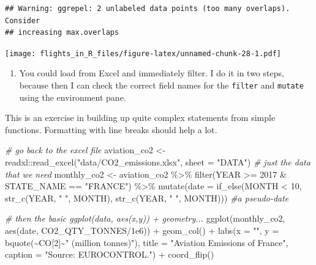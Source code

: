 \documentclass[
]{book}
\newenvironment{Shaded}{\begin{snugshade}}{\end{snugshade}}
\newcommand{\AttributeTok}[1]{\textcolor[rgb]{0.77,0.63,0.00}{#1}}
\newcommand{\CommentTok}[1]{\textcolor[rgb]{0.56,0.35,0.01}{\textit{#1}}}
\newcommand{\DecValTok}[1]{\textcolor[rgb]{0.00,0.00,0.81}{#1}}
\newcommand{\FloatTok}[1]{\textcolor[rgb]{0.00,0.00,0.81}{#1}}
\newcommand{\FunctionTok}[1]{\textcolor[rgb]{0.00,0.00,0.00}{#1}}
\newcommand{\NormalTok}[1]{#1}
\newcommand{\OtherTok}[1]{\textcolor[rgb]{0.56,0.35,0.01}{#1}}
\newcommand{\SpecialCharTok}[1]{\textcolor[rgb]{0.00,0.00,0.00}{#1}}
\newcommand{\StringTok}[1]{\textcolor[rgb]{0.31,0.60,0.02}{#1}}
\providecommand{\tightlist}{%
  \setlength{\itemsep}{0pt}\setlength{\parskip}{0pt}}
\begin{document}
\begin{verbatim}
## Warning: ggrepel: 2 unlabeled data points (too many overlaps). Consider
## increasing max.overlaps
\end{verbatim}

\texttt{[image: flights\_in\_R\_files/figure-latex/unnamed-chunk-28-1.pdf]}

\begin{enumerate}
\def\labelenumi{\arabic{enumi})}
\setcounter{enumi}{2}
\tightlist
\item
  You could load from Excel and immediately filter. I do it in two steps, because then I can check the correct field names for the \texttt{filter} and \texttt{mutate} using the environment pane.
\end{enumerate}

This is an exercise in building up quite complex statements from simple functions. Formatting with line breaks should help a lot.

\begin{Shaded}
\begin{Highlighting}[]
\CommentTok{\# go back to the excel file}
\NormalTok{aviation\_co2 }\OtherTok{\textless{}{-}}\NormalTok{ readxl}\SpecialCharTok{::}\FunctionTok{read\_excel}\NormalTok{(}\StringTok{"data/CO2\_emissions.xlsx"}\NormalTok{, }
                                  \AttributeTok{sheet =} \StringTok{"DATA"}\NormalTok{)}
\CommentTok{\# just the data that we need}
\NormalTok{monthly\_co2 }\OtherTok{\textless{}{-}}\NormalTok{ aviation\_co2 }\SpecialCharTok{\%\textgreater{}\%} 
  \FunctionTok{filter}\NormalTok{(YEAR }\SpecialCharTok{\textgreater{}=} \DecValTok{2017} \SpecialCharTok{\&}\NormalTok{ STATE\_NAME }\SpecialCharTok{==} \StringTok{"FRANCE"}\NormalTok{) }\SpecialCharTok{\%\textgreater{}\%} 
  \FunctionTok{mutate}\NormalTok{(}\AttributeTok{date =} \FunctionTok{if\_else}\NormalTok{(MONTH }\SpecialCharTok{\textless{}} \DecValTok{10}\NormalTok{,}
                        \FunctionTok{str\_c}\NormalTok{(YEAR, }\StringTok{"  "}\NormalTok{, MONTH), }
                        \FunctionTok{str\_c}\NormalTok{(YEAR, }\StringTok{" "}\NormalTok{, MONTH))) }\CommentTok{\#a pseudo{-}date}

\CommentTok{\# then the basic ggplot(data, aes(x,y)) + geometry...}
\FunctionTok{ggplot}\NormalTok{(monthly\_co2, }\FunctionTok{aes}\NormalTok{(date, CO2\_QTY\_TONNES}\SpecialCharTok{/}\FloatTok{1e6}\NormalTok{)) }\SpecialCharTok{+}
  \FunctionTok{geom\_col}\NormalTok{() }\SpecialCharTok{+}
  \FunctionTok{labs}\NormalTok{(}\AttributeTok{x =} \StringTok{""}\NormalTok{, }
       \AttributeTok{y =} \FunctionTok{bquote}\NormalTok{(}\SpecialCharTok{\textasciitilde{}}\NormalTok{CO[}\DecValTok{2}\NormalTok{]}\SpecialCharTok{\textasciitilde{}}\StringTok{" (million tonnes)"}\NormalTok{),}
       \AttributeTok{title =} \StringTok{"Aviation Emissions of France"}\NormalTok{,}
       \AttributeTok{caption =} \StringTok{"Source: EUROCONTROL."}\NormalTok{) }\SpecialCharTok{+}
  \FunctionTok{coord\_flip}\NormalTok{()}
\end{Highlighting}
\end{Shaded}
\end{document}
